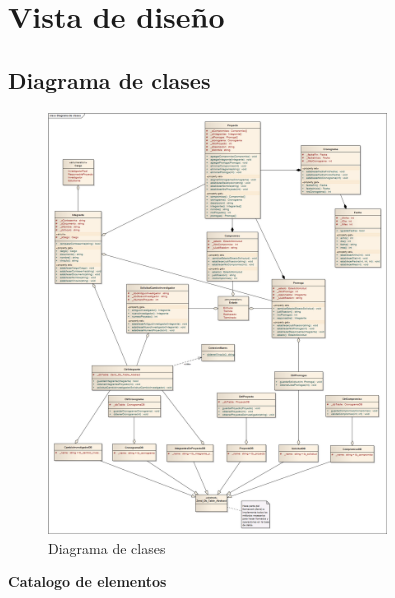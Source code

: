 \documentclass[12pt,oneside,letterpaper]{report}
\begin{document}
\section{Vista de diseño}

\subsection{Diagrama de clases}

\begin{figure}[h!]
  \centering
    \includegraphics[width=0.80\textwidth]{./img/img7.png}
  \caption{Diagrama de clases}
\end{figure}


\item \textbf{Catalogo de elementos}\\
\end{document}
